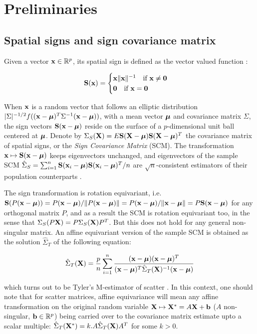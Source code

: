 \documentclass[fleqn,11pt]{article}
\begin{document}
\section{Preliminaries}
\subsection{Spatial signs and sign covariance matrix}
Given a vector ${\bf{x}} \in \mathbb{R}^p$, its spatial sign is defined as the vector valued function \citep{locantore99}:

$$ {\mathbf{S}}({\bf{x}}) = \begin{cases} {\bf{x}}\| {\bf{x}} \|^{-1} \quad \mbox{if }{\bf{x}} \neq \bf0\\
\bf0 \quad \mbox{if }{\bf{x}} = \bf0 \end{cases} $$

When ${\bf{x}}$ is a random vector that follows an elliptic distribution $|\Sigma|^{-1/2} f(({\bf{x}} - {\boldsymbol{\mu}})^T \Sigma^{-1} ({\bf{x}} - {\boldsymbol{\mu}}))$, with a mean vector ${\boldsymbol{\mu}}$ and covariance matrix $\Sigma$, the sign vectors ${\mathbf{S}}({\bf{x}} - {\boldsymbol{\mu}})$ reside on the surface of a $p$-dimensional unit ball centered at ${\boldsymbol{\mu}}$. Denote by $\Sigma_S({\mathbf{X}}) = E{\mathbf{S}} ({\mathbf{X}} - {\boldsymbol{\mu}}){\mathbf{S}} ({\mathbf{X}} - {\boldsymbol{\mu}})^T$ the covariance matrix of spatial signs, or the \textit{Sign Covariance Matrix} (SCM). The transformation ${\bf{x}} \mapsto {\mathbf{S}}({\bf{x}} - {\boldsymbol{\mu}})$ keeps eigenvectors unchanged, and eigenvectors of the sample SCM $ \hat \Sigma_S = \sum_{i=1}^n {\mathbf{S}} ({\bf{x}}_i - {\boldsymbol{\mu}}){\mathbf{S}} ({\bf{x}}_i - {\boldsymbol{\mu}})^T/n $ are $\sqrt n$-consistent estimators of their population counterparts \citep{taskinen12}.

The sign transformation is rotation equivariant, i.e. $ {\mathbf{S}}(P ({\bf{x}} - {\boldsymbol{\mu}})) = P({\bf{x}} - {\boldsymbol{\mu}})/\| P ({\bf{x}} - {\boldsymbol{\mu}})\| = P({\bf{x}} - {\boldsymbol{\mu}})/\|{\bf{x}} - {\boldsymbol{\mu}}\| = P {\mathbf{S}}({\bf{x}} - {\boldsymbol{\mu}})$ for any orthogonal matrix $P$, and as a result the SCM is rotation equivariant too, in the sense that $\Sigma_S(P{\mathbf{X}}) = P \Sigma_S({\mathbf{X}}) P^T$. But this does not hold for any general non-singular matrix. An affine equivariant version of the sample SCM is obtained as the solution $\hat \Sigma_T$ of the following equation:

$$ \hat \Sigma_T({\mathbf{X}}) = \frac{p}{n} \sum_{i=1}^n \frac{({\bf{x}} - {\boldsymbol{\mu}})({\bf{x}} - {\boldsymbol{\mu}})^T}{({\bf{x}} - {\boldsymbol{\mu}})^T \hat\Sigma_T({\mathbf{X}})^{-1} ({\bf{x}} - {\boldsymbol{\mu}})} $$

which turns out to be Tyler's M-estimator of scatter \citep{tyler87}. In this context, one should note that for scatter matrices, affine equivariance will mean any affine transformation on the original random variable ${\mathbf{X}} \mapsto {\mathbf{X}}^* = A{\mathbf{X}} + {\bf{b}}$ ($A$ non-singular, ${\bf{b}} \in \mathbb{R}^p$) being carried over to the covariance matrix estimate upto a scalar multiple: $\hat\Sigma_T({\mathbf{X}}^*) = k. A \hat\Sigma_T({\mathbf{X}}) A^T$ for some $k>0$.
\end{document}
